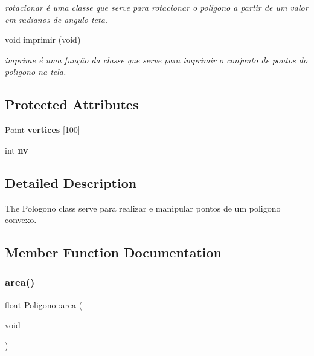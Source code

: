 \begin{DoxyCompactItemize}
\begin{DoxyCompactList}\small\item\em rotacionar é uma classe que serve para rotacionar o poligono a partir de um valor em radianos de angulo teta. \end{DoxyCompactList}\item 
\mbox{\label{class_poligono_af61200b446e9fda58a42355eec49d433}} 
void \mbox{\hyperlink{class_poligono_af61200b446e9fda58a42355eec49d433}{imprimir}} (void)
\begin{DoxyCompactList}\small\item\em imprime é uma função da classe que serve para imprimir o conjunto de pontos do poligono na tela. \end{DoxyCompactList}\end{DoxyCompactItemize}
\subsection*{Protected Attributes}
\begin{DoxyCompactItemize}
\item 
\mbox{\label{class_poligono_a18179d267bdf366f6bb00a4e1b16f1d7}} 
\mbox{\hyperlink{class_point}{Point}} {\bfseries vertices} \mbox{[}100\mbox{]}
\item 
\mbox{\label{class_poligono_af9259ab305f65ba3ac2fa256d72cc047}} 
int {\bfseries nv}
\end{DoxyCompactItemize}


\subsection{Detailed Description}
The Pologono class serve para realizar e manipular pontos de um poligono convexo. 

\subsection{Member Function Documentation}
\mbox{\label{class_poligono_a9b7cb6c339f78a5b9432494d8f94816c}} 
\subsubsection{\texorpdfstring{area()}{area()}}
{\footnotesize\ttfamily float Poligono\+::area (\begin{DoxyParamCaption}\item[{void}]{ }\end{DoxyParamCaption})}



